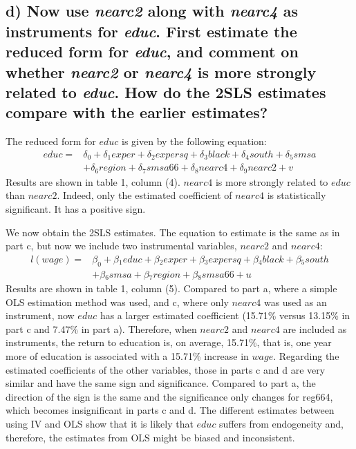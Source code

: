 \documentclass[a4paper, 12pt, twoside]{article}
\begin{document}
\subsection*{d) Now use \textit{nearc2} along with \textit{nearc4} as instruments for \textit{educ}. First estimate the reduced form for \textit{educ}, and comment on whether \textit{nearc2} or \textit{nearc4} is more strongly related to \textit{educ}. How do the 2SLS estimates compare with the earlier estimates?}

The reduced form for $educ$ is given by the following equation:
\begin{equation*}
\begin{split}
educ=&\delta_0+\delta{_1}exper+\delta{_2}expersq+\delta{_3}black+\delta{_4}south+\delta{_5}smsa\\
&+\delta{_6}region+\delta{_7}smsa66+\delta{_8}nearc4+\delta{_9}nearc2+v
\end{split}
\end{equation*}
Results are shown in table 1, column (4). $nearc4$ is more strongly related to $educ$ than $nearc2$. Indeed, only the estimated coefficient of $nearc4$ is statistically significant. It has a positive sign. 
\par\vspace{\baselineskip}

We now obtain the 2SLS estimates. The equation to estimate is the same as in part c, but now we include two instrumental variables, $nearc2$ and $nearc4$:
\begin{equation*}
\begin{split}
l(wage)=&\beta_0+\beta{_1}educ+\beta{_2}exper+\beta{_3}expersq+\beta{_4}black+\beta{_5}south\\
&+\beta{_6}smsa+\beta{_7}region+\beta{_8}smsa66+u
\end{split}
\end{equation*}
Results are shown in table 1, column (5). Compared to part a, where a simple OLS estimation method was used, and c, where only $nearc4$ was used as an instrument, now $educ$ has a larger estimated coefficient (15.71\% versus 13.15\% in part c and 7.47\% in part a). Therefore, when $nearc2$ and $nearc4$ are included as instruments, the return to education is, on average, 15.71\%, that is, one year more of education is associated with a 15.71\% increase in $wage$. Regarding the estimated coefficients of the other variables, those in parts c and d are very similar and have the same sign and significance. Compared to part a, the direction of the sign is the same and the significance only changes for reg664, which becomes insignificant in parts c and d. The different estimates between using IV and OLS show that it is likely that $educ$ suffers from endogeneity and, therefore, the estimates from OLS might be biased and inconsistent. 
\par\vspace{\baselineskip}
\end{document}
